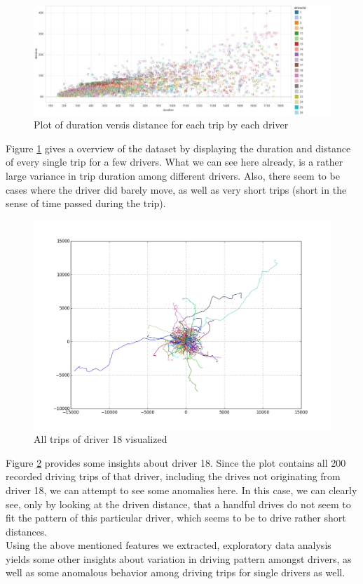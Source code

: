 \documentclass{vldb}
\begin{document}
\begin{figure}
\centering
\includegraphics[width=\linewidth]{"pics/duration-vs-distance-driver"}
\caption{Plot of duration versis distance for each trip by each driver}
\label{fig:duration-vs-distance}
\end{figure}
Figure \ref{fig:duration-vs-distance} gives a overview of the dataset by displaying the duration and distance of every single trip for a few drivers. What we can see here already, is a rather large variance in trip duration among different drivers. Also, there seem to be cases where the driver did barely move, as well as very short trips (short in the sense of time passed during the trip).\\

\begin{figure}
\centering
\includegraphics[width= 1\linewidth]{"pics/all_drives_18"}%
\caption{All trips of driver 18 visualized}
\label{fig:driver-18}
\end{figure}
Figure \ref{fig:driver-18} provides some insights about driver 18. Since the plot contains all 200 recorded driving trips of that driver, including the drives not originating from driver 18, we can attempt to see some anomalies here. In this case, we can clearly see, only by looking at the driven distance, that a handful drives do not seem to fit the pattern of  this particular driver, which seems to be to drive rather short distances.\\
Using the above mentioned features we extracted, exploratory data analysis yields some other insights about variation in driving pattern amongst drivers, as well as some anomalous behavior among driving trips for single drivers as well.
 
\end{document}

